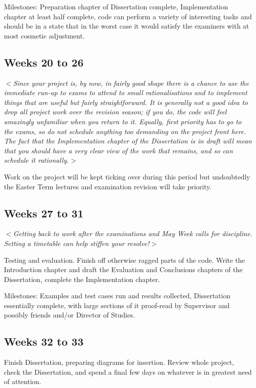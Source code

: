 \documentclass[12pt]{article}
\newcommand{\al}{$<$}
\newcommand{\ar}{$>$}
\begin{document}
Milestones: Preparation chapter of Dissertation complete,
Implementation chapter at least half complete, code can perform a
variety of interesting tasks and should be in a state that in the
worst case it would satisfy the examiners with at most cosmetic
adjustment.


\subsection*{Weeks 20 to 26}

\al\emph{Since your project is, by now, in fairly good shape there is
a chance to use the immediate run-up to exams to attend to small
rationalisations and to implement things that are useful but fairly
straightforward.  It is generally not a good idea to drop all project
work over the revision season; if you do, the code will feel amazingly
unfamiliar when you return to it.  Equally, first priority has to go
to the exams, so do not schedule anything too demanding on the project
front here.  The fact that the Implementation chapter of the
Dissertation is in draft will mean that you should have a very clear
view of the work that remains, and so can schedule it rationally.}\ar

Work on the project will be kept ticking over during this period but
undoubtedly the Easter Term lectures and examination revision will
take priority.


\subsection*{Weeks 27 to 31}

\al\emph{Getting back to work after the examinations and May Week
  calls for discipline.  Setting a timetable can help stiffen your
  resolve!}\ar

Testing and evaluation.  Finish off otherwise ragged parts of the
code.  Write the Introduction chapter and draft the Evaluation and
Conclusions chapters of the Dissertation, complete the Implementation
chapter.

Milestones: Examples and test cases run and results collected,
Dissertation essentially complete, with large sections of it
proof-read by Supervisor and possibly friends and/or Director of
Studies.


\subsection*{Weeks 32 to 33}

Finish Dissertation, preparing diagrams for insertion.  Review whole
project, check the Dissertation, and spend a final few days on
whatever is in greatest need of attention.
\end{document}
